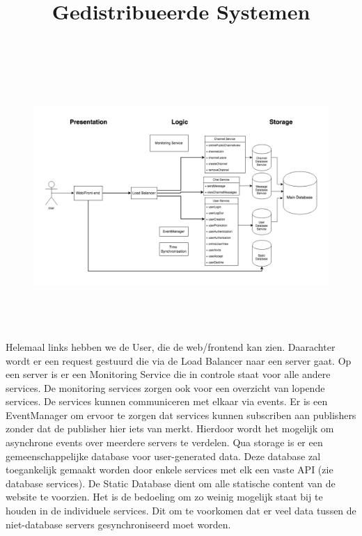 \documentclass{article}
\title{\textmd{\textbf{Gedistribueerde Systemen}}\\\normalsize\vspace{0.1in}\Large{\projectnaam}}
\author{\team}
\date{}
\begin{document}
\maketitle

	\begin{figure}[H]
		\centering
		\includegraphics[height=100mm]{architecture.png}
	\end{figure}

	Helemaal links hebben we de User, die de web/frontend kan zien. Daarachter wordt er een request gestuurd die via de Load Balancer naar een server gaat. 
	Op een server is er een Monitoring Service die in controle staat voor alle andere services. De monitoring services zorgen ook voor een overzicht van lopende services. 
	De services kunnen communiceren met elkaar via events. Er is een EventManager om ervoor te zorgen dat services kunnen subscriben aan publishers zonder dat de publisher hier iets van merkt. Hierdoor wordt het mogelijk om asynchrone events over meerdere servers te verdelen.
	Qua storage is er een gemeenschappelijke database voor user-generated data. Deze database zal toegankelijk gemaakt worden door enkele services met elk een vaste API (zie database services). 
	De Static Database dient om alle statische content van de website te voorzien.
	Het is de bedoeling om zo weinig mogelijk staat bij te houden in de individuele services. Dit om te voorkomen dat er veel data tussen de niet-database servers gesynchroniseerd moet worden.
\end{document}
